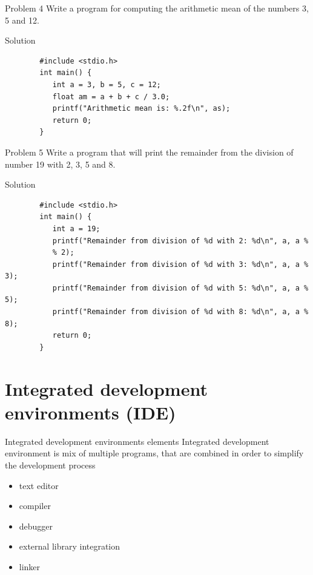 \begin{frame}[fragile]{Problem 4}
Write a program for computing the arithmetic mean of the numbers 3, 5 and 12.
    \begin{exampleblock}{Solution}
        \begin{lstlisting}
        #include <stdio.h>
        int main() {
           int a = 3, b = 5, c = 12;
           float am = a + b + c / 3.0;
           printf("Arithmetic mean is: %.2f\n", as);
           return 0;
        }
        \end{lstlisting}
    \end{exampleblock}
\end{frame}

\begin{frame}[fragile]{Problem 5}
Write a program that will print the remainder from the division of number 19
with 2, 3, 5 and 8.
    \begin{exampleblock}{Solution}
        \begin{lstlisting}
        #include <stdio.h>
        int main() {
           int a = 19;
           printf("Remainder from division of %d with 2: %d\n", a, a %
           % 2);
           printf("Remainder from division of %d with 3: %d\n", a, a % 3);
           printf("Remainder from division of %d with 5: %d\n", a, a % 5);
           printf("Remainder from division of %d with 8: %d\n", a, a % 8);
           return 0;
        }
        \end{lstlisting}
    \end{exampleblock}
\end{frame}

\section{Integrated development environments (IDE)}

\begin{frame}{Integrated development environments elements}
Integrated development environment is mix of multiple programs, that are
combined in order to simplify the development process
\begin{itemize}
  \item text editor
  \item compiler
  \item debugger
  \item external library integration
  \item linker
\end{itemize}
\end{frame}

